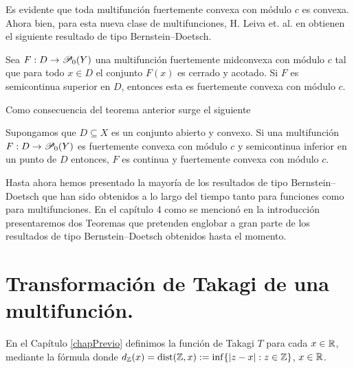 Es evidente que toda multifunción fuertemente convexa con módulo $c$
es convexa. Ahora bien, para esta nueva clase de multifunciones,
H. Leiva et. al. en \cite{LeiMerNikSan13} obtienen el siguiente
resultado de tipo Bernstein--Doetsch.

\begin{theorem}
Sea $F:D\to\P_0(Y)$ una multifunci\'on fuertemente midconvexa con m\'odulo
$c$ tal que para todo $x\in D$ el conjunto $F(x)$ es cerrado y acotado. Si
$F$ es semicontinua superior en $D$, entonces esta es fuertemente
convexa con m\'odulo $c$.
\end{theorem}   

Como consecuencia del teorema anterior surge el siguiente

\begin{corollary}
Supongamos que $D\subseteq X$ es un conjunto abierto y convexo. Si 
una multifunci\'on $F:D\to\P_0(Y)$ es fuertemente convexa con m\'odulo
$c$ y semicontinua inferior en un punto de $D$ entonces, $F$ es continua
y fuertemente convexa con m\'odulo $c$.
\end{corollary}

Hasta ahora hemos presentado la mayoría de los resultados de tipo Bernstein--Doetsch
que han sido obtenidos a lo largo del tiempo tanto para funciones como para
multifunciones. En el cap\'itulo 4 como se mencion\'o en la introducci\'on 
presentaremos dos Teoremas que pretenden englobar a gran parte de los resultados
de tipo Bernstein--Doetsch obtenidos hasta el momento.


\section{Transformación de Takagi de una multifunción.}

En el Capítulo \ref{chapPrevio} definimos la función de Takagi
$T$ para cada $x\in\R$, mediante la fórmula
donde $d_\Z(x) = \dist(\Z,x):=\inf\{|z-x| : z\in\Z\}$, $x\in\R$.

